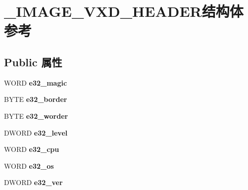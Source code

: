 \hypertarget{struct___i_m_a_g_e___v_x_d___h_e_a_d_e_r}{}\section{\+\_\+\+I\+M\+A\+G\+E\+\_\+\+V\+X\+D\+\_\+\+H\+E\+A\+D\+E\+R结构体 参考}
\label{struct___i_m_a_g_e___v_x_d___h_e_a_d_e_r}
\subsection*{Public 属性}
\begin{DoxyCompactItemize}
\item 
\mbox{\label{struct___i_m_a_g_e___v_x_d___h_e_a_d_e_r_acd070dce363df1d312adb1bd6a178f39}} 
W\+O\+RD {\bfseries e32\+\_\+magic}
\item 
\mbox{\label{struct___i_m_a_g_e___v_x_d___h_e_a_d_e_r_a297c9f65fc3f82dbd41d10dc56bace5a}} 
B\+Y\+TE {\bfseries e32\+\_\+border}
\item 
\mbox{\label{struct___i_m_a_g_e___v_x_d___h_e_a_d_e_r_a67ff2aab95526f97aeae29d53061414c}} 
B\+Y\+TE {\bfseries e32\+\_\+worder}
\item 
\mbox{\label{struct___i_m_a_g_e___v_x_d___h_e_a_d_e_r_ac5d913cebc8de232f5cbbf7098cedb40}} 
D\+W\+O\+RD {\bfseries e32\+\_\+level}
\item 
\mbox{\label{struct___i_m_a_g_e___v_x_d___h_e_a_d_e_r_accd3d45d3dacc688943949982a19f629}} 
W\+O\+RD {\bfseries e32\+\_\+cpu}
\item 
\mbox{\label{struct___i_m_a_g_e___v_x_d___h_e_a_d_e_r_ac4042243975b69453db23db5a9a04593}} 
W\+O\+RD {\bfseries e32\+\_\+os}
\item 
\mbox{\label{struct___i_m_a_g_e___v_x_d___h_e_a_d_e_r_a0f8829c4133783274553ea328091ca23}} 
D\+W\+O\+RD {\bfseries e32\+\_\+ver}
\item 

\end{DoxyCompactItemize}
